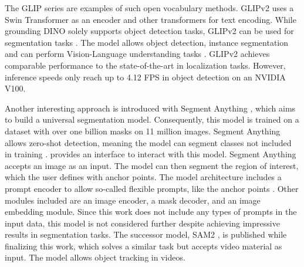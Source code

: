 The GLIP series \cite{GLIPv12022} \cite{glipv22022} are examples of such open vocabulary methods.
GLIPv2 uses a Swin Transformer \cite{swinTransformer2021} as an encoder and other transformers for text encoding.
While grounding DINO solely supports object detection tasks, GLIPv2 can be used for segmentation tasks \cite{groundingdino2024}.
The model allows object detection, instance segmentation and can perform Vision-Language understanding tasks \cite{glipv22022}.
GLIPv2 achieves comparable performance to the state-of-the-art in localization tasks.
However, inference speeds only reach up to 4.12 FPS in object detection on an NVIDIA V100.

\vspace{0.5cm}

Another interesting approach is introduced with Segment Anything \cite{segmentAnything2023}, which aims to build a universal segmentation model.
Consequently, this model is trained on a dataset with over one billion masks on 11 million images.
Segment Anything \cite{segmentAnything2023} allows zero-shot detection, meaning the model can segment classes not included in training \cite{segmentAnything2023} \cite{openvocabularysurvey2024}.
\cite{segmentAnythingOnline} provides an interface to interact with this model.
Segment Anything accepts an image as an input.
The model can then segment the region of interest, which the user defines with anchor points.
The model architecture includes a prompt encoder to allow so-called flexible prompts, like the anchor points \cite{segmentAnything2023}.
Other modules included are an image encoder, a mask decoder, and an image embedding module.
Since this work does not include any types of prompts in the input data, this model is not considered further despite achieving impressive results in segmentation tasks.
The successor model, \ac{SAM2} \cite{segmentAnything22024}, is published while finalizing this work, which solves a similar task but accepts video material as input.
The model allows object tracking in videos.


